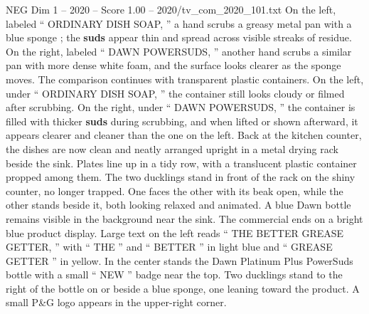 \begin{textsample}{NEG Dim 1 – 2020 – Score 1.00 – 2020/tv\_com\_2020\_101.txt}
On the left, labeled “ ORDINARY DISH SOAP, ” a hand scrubs a greasy metal pan with a blue sponge ; the \textbf{suds} appear thin and spread across visible streaks of residue.
On the right, labeled “ DAWN POWERSUDS, ” another hand scrubs a similar pan with more dense white foam, and the surface looks clearer as the sponge moves.
The comparison continues with transparent plastic containers.
On the left, under “ ORDINARY DISH SOAP, ” the container still looks cloudy or filmed after scrubbing.
On the right, under “ DAWN POWERSUDS, ” the container is filled with thicker \textbf{suds} during scrubbing, and when lifted or shown afterward, it appears clearer and cleaner than the one on the left.
Back at the kitchen counter, the dishes are now clean and neatly arranged upright in a metal drying rack beside the sink.
Plates line up in a tidy row, with a translucent plastic container propped among them.
The two ducklings stand in front of the rack on the shiny counter, no longer trapped.
One faces the other with its beak open, while the other stands beside it, both looking relaxed and animated.
A blue Dawn bottle remains visible in the background near the sink.
The commercial ends on a bright blue product display.
Large text on the left reads “ THE BETTER GREASE GETTER, ” with “ THE ” and “ BETTER ” in light blue and “ GREASE GETTER ” in yellow.
In the center stands the Dawn Platinum Plus PowerSuds bottle with a small “ NEW ” badge near the top.
Two ducklings stand to the right of the bottle on or beside a blue sponge, one leaning toward the product.
A small P\&G logo appears in the upper-right corner.

\end{textsample}

